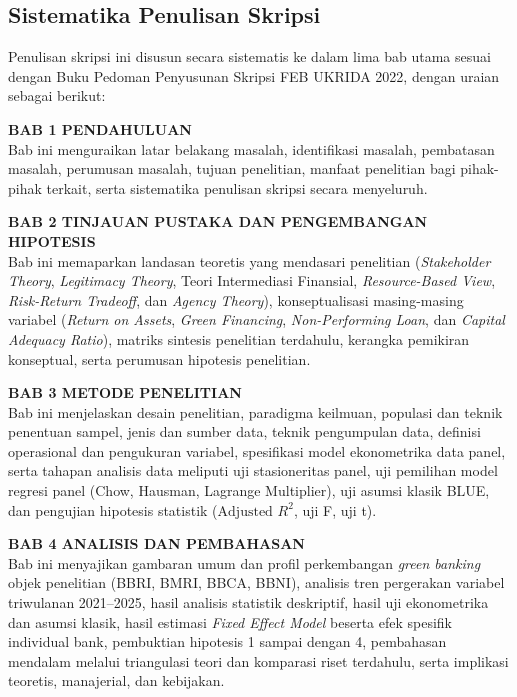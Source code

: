 \documentclass[12pt,a4paper]{article}
\numberwithin{equation}{section}
\begin{document}
\subsection{Sistematika Penulisan Skripsi}

\noindent
Penulisan skripsi ini disusun secara sistematis ke dalam lima bab utama sesuai dengan Buku Pedoman Penyusunan Skripsi FEB UKRIDA 2022, dengan uraian sebagai berikut:

\noindent
\textbf{BAB 1 PENDAHULUAN}\\
Bab ini menguraikan latar belakang masalah, identifikasi masalah, pembatasan masalah, perumusan masalah, tujuan penelitian, manfaat penelitian bagi pihak-pihak terkait, serta sistematika penulisan skripsi secara menyeluruh.

\noindent
\textbf{BAB 2 TINJAUAN PUSTAKA DAN PENGEMBANGAN HIPOTESIS}\\
Bab ini memaparkan landasan teoretis yang mendasari penelitian (\emph{Stakeholder Theory}, \emph{Legitimacy Theory}, Teori Intermediasi Finansial, \emph{Resource-Based View}, \emph{Risk-Return Tradeoff}, dan \emph{Agency Theory}), konseptualisasi masing-masing variabel (\emph{Return on Assets}, \emph{Green Financing}, \emph{Non-Performing Loan}, dan \emph{Capital Adequacy Ratio}), matriks sintesis penelitian terdahulu, kerangka pemikiran konseptual, serta perumusan hipotesis penelitian.

\noindent
\textbf{BAB 3 METODE PENELITIAN}\\
Bab ini menjelaskan desain penelitian, paradigma keilmuan, populasi dan teknik penentuan sampel, jenis dan sumber data, teknik pengumpulan data, definisi operasional dan pengukuran variabel, spesifikasi model ekonometrika data panel, serta tahapan analisis data meliputi uji stasioneritas panel, uji pemilihan model regresi panel (Chow, Hausman, Lagrange Multiplier), uji asumsi klasik BLUE, dan pengujian hipotesis statistik ($\text{Adjusted } R^2$, uji F, uji t).

\noindent
\textbf{BAB 4 ANALISIS DAN PEMBAHASAN}\\
Bab ini menyajikan gambaran umum dan profil perkembangan \emph{green banking} objek penelitian (BBRI, BMRI, BBCA, BBNI), analisis tren pergerakan variabel triwulanan 2021--2025, hasil analisis statistik deskriptif, hasil uji ekonometrika dan asumsi klasik, hasil estimasi \emph{Fixed Effect Model} beserta efek spesifik individual bank, pembuktian hipotesis 1 sampai dengan 4, pembahasan mendalam melalui triangulasi teori dan komparasi riset terdahulu, serta implikasi teoretis, manajerial, dan kebijakan.
\end{document}
